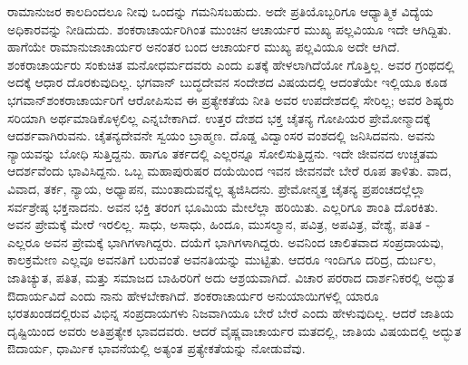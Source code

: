 ರಾಮಾನುಜರ ಕಾಲದಿಂದಲೂ ನೀವು ಒಂದನ್ನು ಗಮನಿಸಬಹುದು. ಅದೇ ಪ್ರತಿಯೊಬ್ಬರಿಗೂ ಆಧ್ಯಾತ್ಮಿಕ ವಿದ್ಯೆಯ ಅಧಿಕಾರವನ್ನು ನೀಡಿದುದು. ಶಂಕರಾಚಾರ್ಯರಿಗಿಂತ ಮುಂಚಿನ ಆಚಾರ್ಯರ ಮುಖ್ಯ ಪಲ್ಲವಿಯೂ ಇದೇ ಆಗಿದ್ದಿತು. ಹಾಗೆಯೇ ರಾಮಾನುಜಾಚಾರ್ಯರ ಅನಂತರ ಬಂದ ಆಚಾರ್ಯರ ಮುಖ್ಯ ಪಲ್ಲವಿಯೂ ಅದೇ ಆಗಿದೆ. ಶಂಕರಾಚಾರ್ಯರು ಸಂಕುಚಿತ ಮನೋಧರ್ಮದವರು ಎಂದು ಏತಕ್ಕೆ ಹೇಳಲಾಗಿದೆಯೋ ಗೊತ್ತಿಲ್ಲ. ಅವರ ಗ್ರಂಥದಲ್ಲಿ ಅದಕ್ಕೆ ಆಧಾರ ದೊರಕುವುದಿಲ್ಲ. ಭಗವಾನ್​ ಬುದ್ಧದೇವನ ಸಂದೇಶದ ವಿಷಯದಲ್ಲಿ ಆದಂತೆಯೇ ಇಲ್ಲಿಯೂ ಕೂಡ ಭಗವಾನ್​ ಶಂಕರಾಚಾರ್ಯರಿಗೆ ಆರೋಪಿಸುವ ಈ ಪ್ರತ್ಯೇಕತೆಯ ನೀತಿ ಅವರ ಉಪದೇಶದಲ್ಲಿ ಸೇರಿಲ್ಲ; ಅವರ ಶಿಷ್ಯರು ಸರಿಯಾಗಿ ಅರ್ಥಮಾಡಿಕೊಳ್ಳಲಿಲ್ಲ ಎನ್ನಬೇಕಾಗಿದೆ. ಉತ್ತರ ದೇಶದ ಭಕ್ತ ಚೈತನ್ಯ ಗೋಪಿಯರ ಪ್ರೇಮೋನ್ಮಾದಕ್ಕೆ ಆದರ್ಶವಾಗಿರುವನು. ಚೈತನ್ಯದೇವನೇ ಸ್ವಯಂ ಬ್ರಾಹ್ಮಣ. ದೊಡ್ಡ ವಿದ್ವಾಂಸರ ವಂಶದಲ್ಲಿ ಜನಿಸಿದವನು. ಅವನು ನ್ಯಾಯವನ್ನು ಬೋಧಿ ಸುತ್ತಿದ್ದನು. ಹಾಗೂ ತರ್ಕದಲ್ಲಿ ಎಲ್ಲರನ್ನೂ ಸೋಲಿಸುತ್ತಿದ್ದನು. ಇದೇ ಜೀವನದ ಉಚ್ಚತಮ ಆದರ್ಶವೆಂದು ಭಾವಿಸಿದ್ದನು. ಒಬ್ಬ ಮಹಾಪುರುಷರ ದಯೆಯಿಂದ ಇವನ ಜೀವನವೇ ಬೇರೆ ರೂಪ ತಾಳಿತು. ವಾದ, ವಿವಾದ, ತರ್ಕ, ನ್ಯಾಯ, ಅಧ್ಯಾಪನ, ಮುಂತಾದುವನ್ನೆಲ್ಲ ತ್ಯಜಿಸಿದನು. ಪ್ರೇಮೋನ್ಮತ್ತ ಚೈತನ್ಯ ಪ್ರಪಂಚದಲ್ಲೆಲ್ಲಾ ಸರ್ವಶ್ರೇಷ್ಠ ಭಕ್ತನಾದನು. ಅವನ ಭಕ್ತಿ ತರಂಗ ಭೂಮಿಯ ಮೇಲೆಲ್ಲಾ ಹರಿಯಿತು. ಎಲ್ಲರಿಗೂ ಶಾಂತಿ ದೊರಕಿತು. ಅವನ ಪ್ರೇಮಕ್ಕೆ ಮೇರೆ ಇರಲಿಲ್ಲ. ಸಾಧು, ಅಸಾಧು, ಹಿಂದೂ, ಮುಸಲ್ಮಾನ, ಪವಿತ್ರ, ಅಪವಿತ್ರ, ವೇಶ್ಯೆ, ಪತಿತ - ಎಲ್ಲರೂ ಅವನ ಪ್ರೇಮಕ್ಕೆ ಭಾಗಿಗಳಾಗಿದ್ದರು. ದಯೆಗೆ ಭಾಗಿಗಳಾಗಿದ್ದರು. ಅವನಿಂದ ಚಾಲಿತವಾದ ಸಂಪ್ರದಾಯವು, ಕಾಲಕ್ರಮೇಣ ಎಲ್ಲವೂ ಅವನತಿಗೆ ಬರುವಂತೆ ಅವನತಿಯನ್ನು ಮುಟ್ಟಿತು. ಆದರೂ ಇಂದಿಗೂ ದರಿದ್ರ, ದುರ್ಬಲ, ಜಾತಿಚ್ಯುತ, ಪತಿತ, ಮತ್ತು ಸಮಾಜದ ಬಾಹಿರರಿಗೆ ಅದು ಆಶ್ರಯವಾಗಿದೆ. ವಿಚಾರ ಪರರಾದ ದಾರ್ಶನಿಕರಲ್ಲಿ ಅದ್ಭುತ ಔದಾರ್ಯವಿದೆ ಎಂದು ನಾನು ಹೇಳಬೇಕಾಗಿದೆ. ಶಂಕರಾಚಾರ್ಯರ ಅನುಯಾಯಿಗಳಲ್ಲಿ ಯಾರೂ ಭರತಖಂಡದಲ್ಲಿರುವ ವಿಭಿನ್ನ ಸಂಪ್ರದಾಯಗಳು ನಿಜವಾಗಿಯೂ ಬೇರೆ ಬೇರೆ ಎಂದು ಹೇಳುವುದಿಲ್ಲ. ಆದರೆ ಜಾತಿಯ ದೃಷ್ಟಿಯಿಂದ ಅವರು ಅತಿಪ್ರತ್ಯೇಕ ಭಾವದವರು. ಆದರೆ ವೈಷ್ಣವಾಚಾರ್ಯರ ಮತದಲ್ಲಿ, ಜಾತಿಯ ವಿಷಯದಲ್ಲಿ ಅದ್ಭುತ ಔದಾರ್ಯ, ಧಾರ್ಮಿಕ ಭಾವನೆಯಲ್ಲಿ ಅತ್ಯಂತ ಪ್ರತ್ಯೇಕತೆಯನ್ನು ನೋಡುವೆವು.

